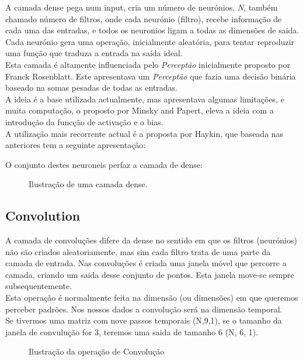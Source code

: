 A camada dense pega num input, cria um número de neurónios, \textit{N}, também chamado número de filtros, onde cada neurónio (filtro), recebe informação de cada uma das entradas, e todos os neuronios ligam a todas as dimensões de saida. \\
Cada neurónio gera uma operação, inicialmente aleatória, para tentar reproduzir uma função que traduza a entrada na saída ideal. \\
Esta camada é altamente influenciada pelo \textit{Perceptão} inicialmente proposto por Franck Rosenblatt\cite{Rosenblatt1958}. Este apresentava um \textit{Perceptão} que fazia uma decisão binária baseado na somas pesadas de todas as entradas. \\
A ideia é a base utilizada actualmente, mas apresentava algumas limitações, e muita computação, o proposto por Minsky and Papert\cite{Minsky1969}, eleva a ideia com a introdução da funcção de activação e o bias. \\
A utilização mais recorrente actual é a proposta por Haykin\cite{Haykin1999}, que baseada nas anteriores tem a seguinte apresentação:


O conjunto destes neuroneis perfaz a camada de dense:

\begin{figure}[H]
	\centering
	\resizebox{\linewidth}{!}{}
	\caption{Ilustração de uma camada dense.}
	\label{fig:dense}
\end{figure}



\subsection{Convolution\label{se:conv_layer}}

A camada de convoluções difere da dense no sentido em que os filtros (neurónios) não são criados aleatoriamente, mas sim cada filtro trata de uma parte da camada de entrada.
Nas convoluções é criada uma janela móvel que percorre a camada, criando um saida desse conjunto de pontos. Esta janela move-se sempre subsequentemente.\\
Esta operação é normalmente feita na dimensão (ou dimensões) em que queremos perceber padrões. Nos nossos dados a convolução será na dimensão temporal. \\
Se tivermos uma matriz com nove passos temporais (N,9,1), se o tamanho da janela de convulução for 3, teremos uma saida de tamanho 6 (N, 6, 1).

\begin{figure}[H]
	\centering
	\resizebox{\linewidth}{!}{}
	\caption{Ilustração da operação de Convolução}
	\label{fig:conv_layer1D}
\end{figure}

